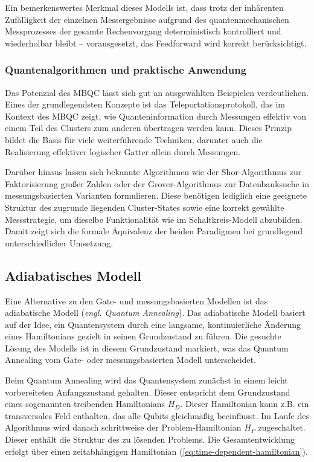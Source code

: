 Ein bemerkenswertes Merkmal dieses Modells ist, dass trotz der inhärenten Zufälligkeit der einzelnen Messergebnisse aufgrund des quantenmechanischen Messprozesses der gesamte Rechenvorgang deterministisch kontrolliert und wiederholbar bleibt – vorausgesetzt, das Feedforward wird korrekt berücksichtigt. \autocite[3-4]{briegelMeasurementbasedQuantumComputation2009}

\subsubsection*{Quantenalgorithmen und praktische Anwendung}

Das Potenzial des MBQC lässt sich gut an ausgewählten Beispielen verdeutlichen. Eines der grundlegendsten Konzepte ist das Teleportationsprotokoll, das im Kontext des MBQC zeigt, wie Quanteninformation durch Messungen effektiv von einem Teil des Clusters zum anderen übertragen werden kann. Dieses Prinzip bildet die Basis für viele weiterführende Techniken, darunter auch die Realisierung effektiver logischer Gatter allein durch Messungen.

Darüber hinaus lassen sich bekannte Algorithmen wie der Shor-Algorithmus zur Faktorisierung großer Zahlen oder der Grover-Algorithmus zur Datenbanksuche in messungsbasierten Varianten formulieren. Diese benötigen lediglich eine geeignete Struktur des zugrunde liegenden Cluster-States sowie eine korrekt gewählte Messstrategie, um dieselbe Funktionalität wie im Schaltkreis-Modell abzubilden. Damit zeigt sich die formale Äquivalenz der beiden Paradigmen bei grundlegend unterschiedlicher Umsetzung. \autocite[2]{briegelMeasurementbasedQuantumComputation2009}

\subsection{Adiabatisches Modell}

Eine Alternative zu den Gate- und messungsbasierten Modellen ist das adiabatische Modell (\textit{engl. Quantum Annealing}). Das adiabatische Modell basiert auf der Idee, ein Quantensystem durch eine langsame, kontinuierliche Änderung eines Hamiltonians gezielt in seinen Grundzustand zu führen. Die gesuchte Lösung des Modells ist in diesem Grundzustand markiert, was das Quantum Annealing vom Gate- oder messungsbasierten Modell unterscheidet.

Beim Quantum Annealing wird das Quantensystem zunächst in einem leicht vorbereiteten Anfangszustand gehalten. Dieser entspricht dem Grundzustand eines sogenannten treibenden Hamiltonians $H_D$. Dieser Hamiltonian kann z.B. ein transversales Feld enthalten, das alle Qubits gleichmäßig beeinflusst. Im Laufe des Algorithmus wird danach schrittweise der Problem-Hamiltonian $H_P$ zugeschaltet. Dieser enthält die Struktur des zu lösenden Problems. Die Gesamtentwicklung erfolgt über einen zeitabhängigen Hamiltonian (\autoref{eq:time-dependent-hamiltonian}).

